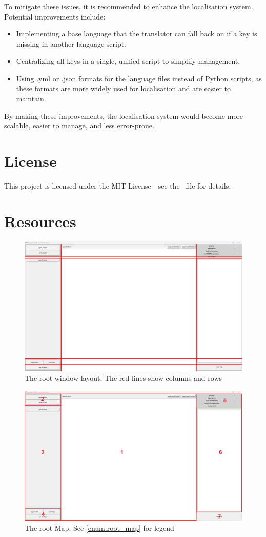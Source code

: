 \documentclass{article}
\begin{document}
To mitigate these issues, it is recommended to enhance the localisation system. Potential improvements include:
\begin{itemize}
    \item Implementing a base language that the translator can fall back on if a key is missing in another language script.
    \item Centralizing all keys in a single, unified script to simplify management.
    \item Using .yml or .json formats for the language files instead of Python scripts, as these formats are more widely used for localisation and are easier to maintain.
\end{itemize}

By making these improvements, the localisation system would become more scalable, easier to manage, and less error-prone.

\newpage
\section{License}
\label{sec:license}
This project is licensed under the MIT License - see the \License\ file for details.

\newpage
\section{Resources}
\label{sec:resources}

\begin{figure}[h]
    \centering
    \includegraphics[width=0.75\linewidth]{root_layout.png}
    \caption{The root window layout. The red lines show columns and rows}
    \label{fig:root_layout}
\end{figure}
\begin{figure}[h]
    \centering
    \includegraphics[width=0.75\linewidth]{root_map.png}
    \caption{The root Map. See \ref{enum:root_map} for legend}
    \label{fig:root_map}
\end{figure}
\end{document}
